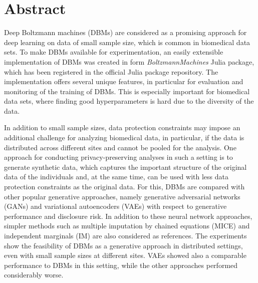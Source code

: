 \documentclass[12pt]{article}
\newcommand{\apkg}[1]{\emph{#1}}
\begin{document}



\tableofcontents
\newpage
\onehalfspacing
\setlength{\emergencystretch}{3em}

\section*{Abstract}


Deep Boltzmann machines (DBMs) are considered as a promising approach for deep learning on data of small sample size, which is common in biomedical data sets.
To make DBMs available for experimentation, an easily extensible implementation of DBMs was created in form \apkg{BoltzmannMachines} Julia package, which has been registered in the official Julia package repository.
The implementation offers several unique features, in particular for evaluation and monitoring of the training of DBMs.
This is especially important for biomedical data sets, where finding good hyperparameters is hard due to the diversity of the data.

In addition to small sample sizes, data protection constraints may impose an additional challenge for analyzing biomedical data, in particular, if the data is distributed across different sites and cannot be pooled for the analysis.
One approach for conducting privacy-preserving analyses in such a setting is to generate synthetic data, which captures the important structure of the original data of the individuals and, at the same time, can be used with less data protection constraints as the original data.
For this, DBMs are compared with other popular generative approaches, namely generative adversarial networks (GANs) and variational autoencoders (VAEs) with respect to generative performance and disclosure risk.
In addition to these neural network approaches, simpler methods such as multiple imputation by chained equations (MICE) and independent marginals (IM) are also considered as references.
The experiments show the feasibility of DBMs as a generative approach in distributed settings, even with small sample sizes at different sites.
VAEs showed also a comparable performance to DBMs in this setting, while the other approaches performed considerably worse.
\end{document}
